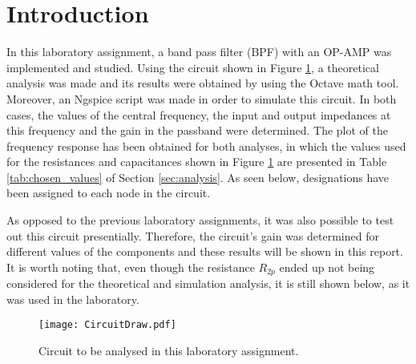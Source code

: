 \section{Introduction} \label{sec:introduction}

In this laboratory assignment, a band pass filter (BPF) with an OP-AMP was implemented and studied. Using the circuit shown in Figure \ref{fig:CircuitDraw}, a theoretical analysis was made and its results were obtained by using the Octave math tool. Moreover, an Ngspice script was made in order to simulate this circuit. In both cases, the values of the central frequency, the input and output impedances at this frequency and the gain in the passband were determined. The plot of the frequency response has been obtained for both analyses, in which the values used for the resistances and capacitances shown in Figure \ref{fig:CircuitDraw} are presented in Table \ref{tab:chosen_values} of Section \ref{sec:analysis}. As seen below, designations have been assigned to each node in the circuit.
\par
As opposed to the previous laboratory assignments, it was also possible to test out this circuit presentially. Therefore, the circuit's gain was determined for different values of the components and these results will be shown in this report. It is worth noting that, even though the resistance $R_{2p}$ ended up not being considered for the theoretical and simulation analysis, it is still shown below, as it was used in the laboratory.

\begin{figure}[H] \centering
  \texttt{[image: CircuitDraw.pdf]}
  \caption{Circuit to be analysed in this laboratory assignment.}
  \label{fig:CircuitDraw}
\end{figure}

